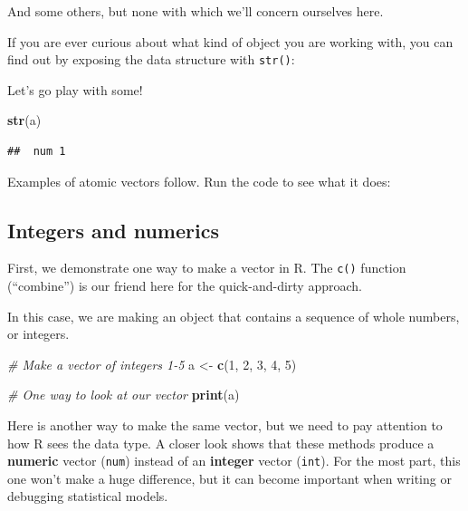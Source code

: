 \documentclass[
]{book}
\newenvironment{Shaded}{\begin{snugshade}}{\end{snugshade}}
\newcommand{\CommentTok}[1]{\textcolor[rgb]{0.56,0.35,0.01}{\textit{#1}}}
\newcommand{\DecValTok}[1]{\textcolor[rgb]{0.00,0.00,0.81}{#1}}
\newcommand{\KeywordTok}[1]{\textcolor[rgb]{0.13,0.29,0.53}{\textbf{#1}}}
\newcommand{\NormalTok}[1]{#1}
\newcommand{\StringTok}[1]{\textcolor[rgb]{0.31,0.60,0.02}{#1}}
\begin{document}
And some others, but none with which we'll concern ourselves here.

If you are ever curious about what kind of object you are working with, you can find out by exposing the data structure with \texttt{str()}:

Let's go play with some!

\begin{Shaded}
\begin{Highlighting}[]
\KeywordTok{str}\NormalTok{(a)}
\end{Highlighting}
\end{Shaded}

\begin{verbatim}
##  num 1
\end{verbatim}

Examples of atomic vectors follow. Run the code to see what it does:

\hypertarget{nums}{%
\subsection*{Integers and numerics}\label{nums}}

First, we demonstrate one way to make a vector in R. The \texttt{c()} function (``combine'') is our friend here for the quick-and-dirty approach.

In this case, we are making an object that contains a sequence of whole numbers, or integers.

\begin{Shaded}
\begin{Highlighting}[]
\CommentTok{# Make a vector of integers 1-5}
\NormalTok{a <-}\StringTok{ }\KeywordTok{c}\NormalTok{(}\DecValTok{1}\NormalTok{, }\DecValTok{2}\NormalTok{, }\DecValTok{3}\NormalTok{, }\DecValTok{4}\NormalTok{, }\DecValTok{5}\NormalTok{)}

\CommentTok{# One way to look at our vector}
\KeywordTok{print}\NormalTok{(a)}
\end{Highlighting}
\end{Shaded}

Here is another way to make the same vector, but we need to pay attention to how R sees the data type. A closer look shows that these methods produce a \textbf{numeric} vector (\texttt{num}) instead of an \textbf{integer} vector (\texttt{int}). For the most part, this one won't make a huge difference, but it can become important when writing or debugging statistical models.
\end{document}
